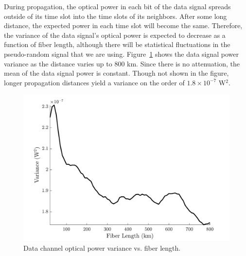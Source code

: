 During propagation, the optical power in each bit of the data signal spreads outside of its time slot into the time slots of its neighbors. After some long distance, the expected power in each time slot will become the same. Therefore, the variance of the data signal's optical power is expected to decrease as a function of fiber length, although there will be statistical fluctuations in the pseudo-random signal that we are using. Figure~\ref{fig:NACalcVar} shows the data signal power variance as the distance varies up to $800$ km. Since there is no attenuation, the mean of the data signal power is constant. Though not shown in the figure, longer propagation distances yield a variance on the order of $1.8 \times 10^{-7}$ W$^2$.
%
\begin{figure}[htb]
	\raggedright
	\includegraphics[scale=0.8]{img/NACalcVar}
	\renewcommand{\baselinestretch}{1}
	\small\normalsize
	\caption{Data channel optical power variance vs. fiber length.} \label{fig:NACalcVar}
\end{figure}
\renewcommand{\baselinestretch}{2}
\small\normalsize

